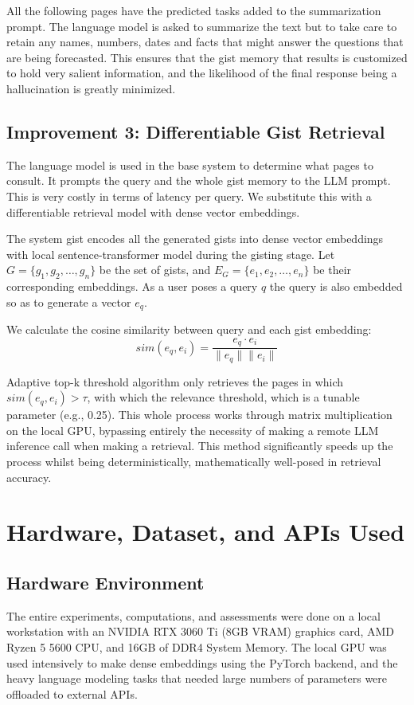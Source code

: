 \documentclass[conference]{IEEEtran}
\begin{document}
All the following pages have the predicted tasks added to the summarization prompt. The language model is asked to summarize the text but to take care to retain any names, numbers, dates and facts that might answer the questions that are being forecasted. This ensures that the gist memory that results is customized to hold very salient information, and the likelihood of the final response being a hallucination is greatly minimized.

\subsection{Improvement 3: Differentiable Gist Retrieval}
The language model is used in the base system to determine what pages to consult. It prompts the query and the whole gist memory to the LLM prompt. This is very costly in terms of latency per query. We substitute this with a differentiable retrieval model with dense vector embeddings.

The system gist encodes all the generated gists into dense vector embeddings with local sentence-transformer model during the gisting stage. Let $G = \{g_1, g_2, \dots, g_n\}$ be the set of gists, and $E_G = \{e_1, e_2, \dots, e_n\}$ be their corresponding embeddings. As a user poses a query $q$ the query is also embedded so as to generate a vector $e_q$. 

We calculate the cosine similarity between query and each gist embedding:
\begin{equation}
sim(e_q, e_i) = \frac{e_q \cdot e_i}{\|e_q\| \|e_i\|}
\end{equation}

Adaptive top-k threshold algorithm only retrieves the pages in which $sim(e_q, e_i) > \tau$, with which the relevance threshold, which is a tunable parameter (e.g., 0.25). This whole process works through matrix multiplication on the local GPU, bypassing entirely the necessity of making a remote LLM inference call when making a retrieval. This method significantly speeds up the process whilst being deterministically, mathematically well-posed in retrieval accuracy.

\section{Hardware, Dataset, and APIs Used}
\subsection{Hardware Environment}
The entire experiments, computations, and assessments were done on a local workstation with an NVIDIA RTX 3060 Ti (8GB VRAM) graphics card, AMD Ryzen 5 5600 CPU, and 16GB of DDR4 System Memory. The local GPU was used intensively to make dense embeddings using the PyTorch backend, and the heavy language modeling tasks that needed large numbers of parameters were offloaded to external APIs.
\end{document}
